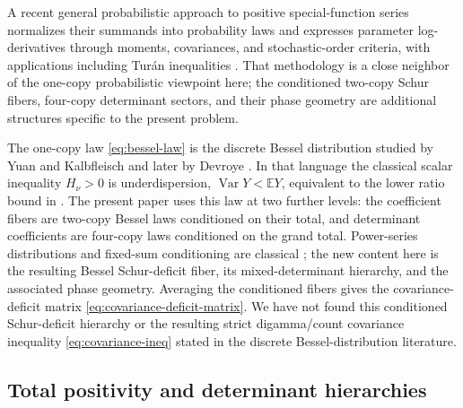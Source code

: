 \documentclass[11pt,a4paper]{amsart}
\numberwithin{equation}{section}
\theoremstyle{plain}
\theoremstyle{definition}
\newcommand{\E}{\mathbb E}
\begin{document}
A recent general probabilistic approach to positive special-function series
normalizes their summands into probability laws and expresses parameter
log-derivatives through moments, covariances, and stochastic-order criteria,
with applications including Tur\'an inequalities \cite{Derbazi2026SignRule}.
That methodology is a close neighbor of the one-copy probabilistic viewpoint
here; the conditioned two-copy Schur fibers, four-copy determinant sectors,
and their phase geometry are additional structures specific to the present
problem.

The one-copy law \eqref{eq:bessel-law} is the discrete Bessel distribution
studied by Yuan and Kalbfleisch and later by Devroye
\cite{YuanKalbfleisch2000Bessel,Devroye2002Bessel}.  In that language the
classical scalar inequality \(H_\nu>0\) is underdispersion,
\(\operatorname{Var}Y<\E Y\), equivalent to the lower ratio bound in
\cite[eq.~(A.5)]{YuanKalbfleisch2000Bessel}.  The present paper uses this law
at two further levels: the coefficient fibers are two-copy Bessel laws
conditioned on their total, and determinant coefficients are four-copy laws
conditioned on the grand total.  Power-series distributions and fixed-sum conditioning are classical
\cite{Canton2026PowerSeries,Patil1962PowerSeries,PatilSeshadri1964Characterization};
the new content here is the resulting Bessel Schur-deficit fiber, its
mixed-determinant hierarchy, and the associated phase geometry.  Averaging the
conditioned fibers gives the covariance-deficit matrix
\eqref{eq:covariance-deficit-matrix}.  We have not found this conditioned
Schur-deficit hierarchy or the resulting strict digamma/count covariance
inequality \eqref{eq:covariance-ineq} stated in the discrete
Bessel-distribution literature.

\subsection{Total positivity and determinant hierarchies}\label{subsec:total-positivity-determinant-hierarchies}
\end{document}
